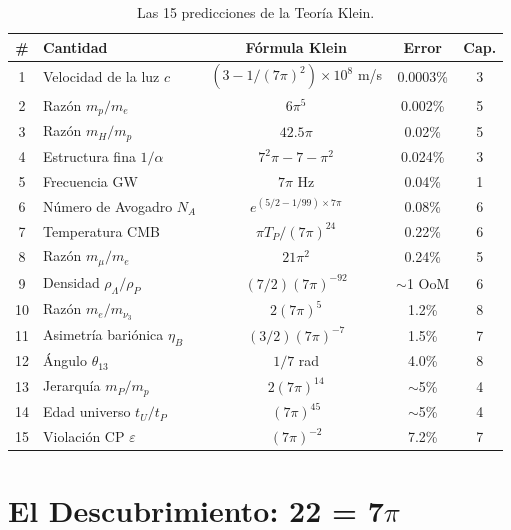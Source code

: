 \documentclass[12pt,a4paper,openany]{book}
\begin{document}
\begin{table}[H]
\centering
\small
\begin{tabular}{clccc}
\toprule
\# & \textbf{Cantidad} & \textbf{Fórmula Klein} & \textbf{Error} & \textbf{Cap.} \\
\midrule
1 & Velocidad de la luz $c$ & $(3 - 1/(7\pi)^2) \times 10^8$ m/s & 0.0003\% & 3 \\
2 & Razón $m_p/m_e$ & $6\pi^5$ & 0.002\% & 5 \\
3 & Razón $m_H/m_p$ & $42.5\pi$ & 0.02\% & 5 \\
4 & Estructura fina $1/\alpha$ & $7^2\pi - 7 - \pi^2$ & 0.024\% & 3 \\
5 & Frecuencia GW & $7\pi$ Hz & 0.04\% & 1 \\
6 & Número de Avogadro $N_A$ & $e^{(5/2-1/99) \times 7\pi}$ & 0.08\% & 6 \\
7 & Temperatura CMB & $\pi T_P/(7\pi)^{24}$ & 0.22\% & 6 \\
8 & Razón $m_\mu/m_e$ & $21\pi^2$ & 0.24\% & 5 \\
9 & Densidad $\rho_\Lambda/\rho_P$ & $(7/2)(7\pi)^{-92}$ & $\sim$1 OoM & 6 \\
10 & Razón $m_e/m_{\nu_3}$ & $2(7\pi)^5$ & 1.2\% & 8 \\
11 & Asimetría bariónica $\eta_B$ & $(3/2)(7\pi)^{-7}$ & 1.5\% & 7 \\
12 & Ángulo $\theta_{13}$ & $1/7$ rad & 4.0\% & 8 \\
13 & Jerarquía $m_P/m_p$ & $2(7\pi)^{14}$ & $\sim$5\% & 4 \\
14 & Edad universo $t_U/t_P$ & $(7\pi)^{45}$ & $\sim$5\% & 4 \\
15 & Violación CP $\varepsilon$ & $(7\pi)^{-2}$ & 7.2\% & 7 \\
\bottomrule
\end{tabular}
\caption{Las 15 predicciones de la Teoría Klein.}
\end{table}

\chapter{El Descubrimiento: 22 = 7$\pi$}
\end{document}
